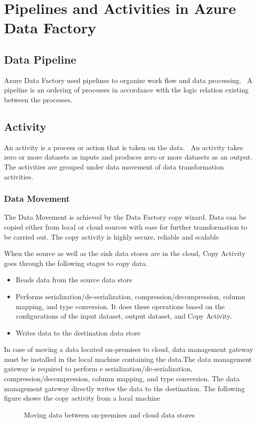 \documentclass[9pt,twocolumn,twoside]{styles/osajnl}
\begin{document}
\section{Pipelines and Activities in Azure Data Factory}
\subsection{Data Pipeline}
Azure Data Factory used pipelines to organize work flow and data processing.~\cite{www-microsoft-azure-pipelines} A pipeline is an ordering of processes in accordance with the logic relation existing between the processes. 

\subsection{Activity} 
An activity is a process or action that is taken on the data.~\cite{www-microsoft-azure-pipelines} An activity takes zero or more datasets as inputs and produces zero or more datasets as an output. The activities are grouped under data movement of data transformation activities.

\subsubsection{Data Movement}
The Data Movement is achieved by the Data Factory copy wizard. Data can be copied either from local or cloud sources with ease for further transformation to be carried out. The copy activity is highly secure, reliable and scalable

When the source as well as the sink data stores are in the cloud, Copy Activity goes through the following stages to copy data. 
\begin{itemize}
    \item Reads data from the source data store\item Performs serialization/de-serialization, compression/decompression, column mapping, and type conversion. It does these operations based on the configurations of the input dataset, output dataset, and Copy Activity.\item Writes data to the destination data store
\end{itemize}

In case of moving a data located on-premises to cloud, data management gateway must be installed in the local machine containing the data.The data management gateway is required to perform e serialization/de-serialization, compression/decompression, column mapping, and type conversion. The data management gateway directly writes the data to the destination. The following figure shows the copy activity from a local machine
\begin{figure}[htbp]
\centering
{}
\caption{Moving data between on-premises and cloud data stores}
\label{fig:copy-local}
\end{figure}
\end{document}

